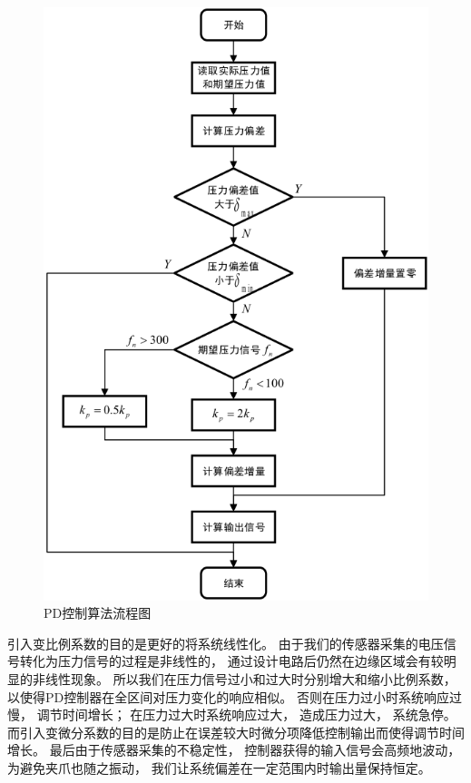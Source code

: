 \begin{figure}[!ht]
  \centering
  \includegraphics[scale=0.6]{chapter03/pic/3-3}
  \caption{PD控制算法流程图}
  \label{fig:3-3}
  \vspace{-0.3cm}
\end{figure}

引入变比例系数的目的是更好的将系统线性化。
由于我们的传感器采集的电压信号转化为压力信号的过程是非线性的，
通过设计电路后仍然在边缘区域会有较明显的非线性现象。
所以我们在压力信号过小和过大时分别增大和缩小比例系数，
以使得PD控制器在全区间对压力变化的响应相似。
否则在压力过小时系统响应过慢， 调节时间增长；
在压力过大时系统响应过大， 造成压力过大， 系统急停。
而引入变微分系数的目的是防止在误差较大时微分项降低控制输出而使得调节时间增长。
最后由于传感器采集的不稳定性， 控制器获得的输入信号会高频地波动， 为避免夹爪也随之振动，
我们让系统偏差在一定范围内时输出量保持恒定。

